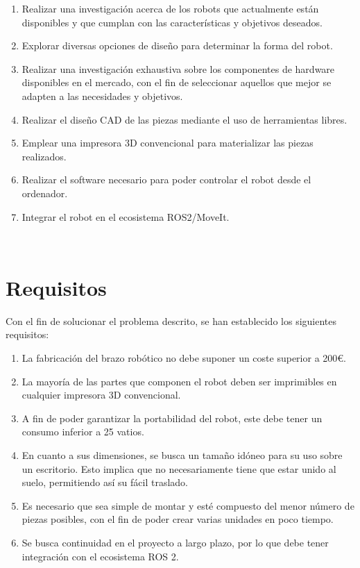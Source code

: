 \begin{enumerate}
    \item Realizar una investigación acerca de los robots que actualmente están disponibles y que cumplan con 
          las características y objetivos deseados. 
    \item Explorar diversas opciones de diseño para determinar la forma del robot. 
      
    \item Realizar una investigación exhaustiva sobre los componentes de hardware disponibles en el mercado, con el fin de seleccionar 
          aquellos que mejor se adapten a las necesidades y objetivos.
    
    \item Realizar el diseño \acs{CAD} de las piezas mediante el uso de herramientas libres. 

    \item Emplear una impresora 3D convencional para materializar las piezas realizados.

    \item Realizar el software necesario para poder controlar el robot desde el ordenador.

    \item Integrar el robot en el ecosistema \ac{ROS}2/MoveIt. 
 
\end{enumerate}\

\section{Requisitos}
\label{sec:requisitos}
\noindent Con el fin de solucionar el problema descrito, se han establecido los siguientes requisitos:
\begin{enumerate}
      \item La fabricación del brazo robótico no debe suponer un coste superior a 200\euro.
      \item La mayoría de las partes que componen el robot deben ser imprimibles en cualquier impresora 3D convencional.
      \item A fin de poder garantizar la portabilidad del robot, este debe tener un consumo inferior a 25 vatios.
      \item En cuanto a sus dimensiones, se busca un tamaño idóneo para su uso sobre un escritorio. Esto implica que no necesariamente 
      tiene que estar unido al suelo, permitiendo así su fácil traslado.
      \item Es necesario que sea simple de montar y esté compuesto del menor número de piezas posibles, con el fin de poder crear varias unidades 
      en poco tiempo. 
      \item Se busca continuidad en el proyecto a largo plazo, por lo que debe tener integración con el ecosistema \acs{ROS} 2. 

\end{enumerate}\

